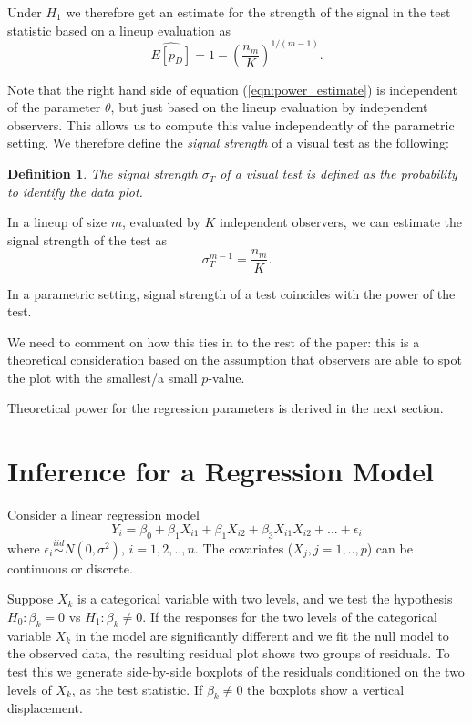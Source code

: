 \documentclass{article}
\newcommand{\blue}[1]{{\color{blue} #1}}
\newcommand{\red}[1]{{\color{red} #1}}
\newtheorem{dfn}{Definition}[section]
\begin{document}
Under $H_1$ we therefore get an estimate for the strength of the signal in the test statistic based on a lineup evaluation as 
\begin{equation}\label{eqn:power_estimate}
\widehat{E[p_D]} = 1- \left(\frac{n_m}{K}\right)^{1/(m-1)}.
\end{equation}

\blue{Note that the right hand side of equation (\ref{eqn:power_estimate}) is independent of the parameter $\theta$, but just based on the lineup evaluation by independent observers. This allows us to compute this value independently of the parametric setting. We therefore define the {\it signal strength} of a  visual test as the following:

\begin{dfn} \label{dfn:signal}
The {\it signal strength} $\sigma_T$ of a visual test is defined as the probability to identify the data plot.
\end{dfn}

In a lineup of size $m$, evaluated by $K$ independent observers,  we can estimate the signal strength of the test as
\[
\sigma_T^{m-1} = \frac{n_m}{K}.
\]

In a parametric setting, signal strength of a test coincides with the power of the test.
}

\red{We need to comment on how this ties in to the rest of the paper: this is a theoretical consideration based on the assumption that observers are able to spot the plot with the smallest/a small $p$-value.}

Theoretical power for the regression parameters is derived in the next section.
\section{Inference for a Regression Model} \label{sec:regression}

Consider a linear regression model 
\begin{equation}\label{multi} Y_i = \beta_0 + \beta_1 X_{i1} + \beta_1 X_{i2} + \beta_3 X_{i1}X_{i2} + ... + \epsilon_i 
\end{equation}
where $\epsilon_i \stackrel{iid}{ \sim } N(0,\sigma^2)$, $i=1,2, .., n$. The covariates ($X_j, j=1,..,p$) can be continuous or discrete. 

Suppose $X_k$ is a categorical variable with two levels, and we test the hypothesis $H_0:\beta_k=0$ vs $H_1: \beta_k \ne 0$. If the responses for the two levels of the categorical variable $X_k$ in the model are significantly different and we fit the null model to the observed data, the resulting residual plot shows two groups of residuals. To test this we generate side-by-side boxplots of the residuals conditioned on the two levels of $X_k$, as the test statistic. If $\beta_k\ne 0$ the boxplots show a vertical displacement. 
\end{document}
